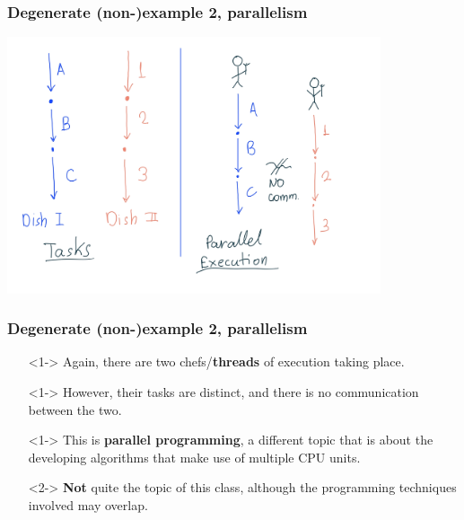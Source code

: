 \documentclass[xcolor={dvipsnames,svgnames},aspectratio=169]{beamer}
\begin{document}
\begin{frame}[fragile]
  \frametitle{Degenerate (non-)example 2, parallelism}

  \begin{center}
    \includegraphics[width=11cm,keepaspectratio]{media/lecture1-para.png}
  \end{center}

\end{frame}

\begin{frame}[fragile]
  \frametitle{Degenerate (non-)example 2, parallelism}

  \large{
    \begin{itemize}
    \item[\faBook]<1-> Again, there are two chefs/\textbf{threads} of
      execution taking place.
    \item[\faBook]<1-> However, their tasks are distinct, and there is no
      communication between the two.
    \item[\faBook]<1-> This is \textbf{parallel programming}, a different topic
      that is about the developing algorithms that make use of
      multiple CPU units.
    \item[\faBook]<2-> \textbf{Not} quite the topic of this class,
      although the programming techniques involved may overlap.
    \end{itemize}}

\end{frame}
\end{document}

